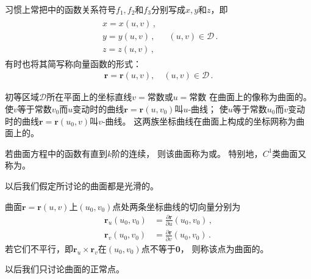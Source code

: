 习惯上常把中的函数关系符号$f_1,f_2$和$f_3$分别写成$x,y$和$z$，即
\begin{align}\label{eq:03ex01.10}
    \begin{array}{l}
        x=x(u,v)\, , \\
        y=y(u,v)\, , \\
        z=z(u,v)\, ,
    \end{array}\quad (u,v)\in \mathscr{D}\, .
\end{align}
有时也将其简写称向量函数的形式：
\begin{align}\label{eq:03ex01.11}
    \bm r=\bm r(u,v),\quad (u,v)\in \mathscr{D}\, .
\end{align}

\begin{definition}
    初等区域$\mathscr{D}$所在平面上的坐标直线$v=$常数或$u=$常数
    在曲面上的像称为曲面的。
    使$v$等于常数$v_0$而$u$变动时的曲线$\bm r=\bm r(u,v_0)$叫$u$-曲线；
    使$u$等于常数$u_0$而$v$变动时的曲线$\bm r=\bm r(u_0,v)$叫$v$-曲线。
    这两族坐标曲线在曲面上构成的坐标网称为曲面上的。
\end{definition}

\begin{definition}
    若曲面方程中的函数有直到$k$阶的连续，
    则该曲面称为或。
    特别地，$C^1$类曲面又称为。
\end{definition}

以后我们假定所讨论的曲面都是光滑的。

\begin{definition}
    曲面$\bm r=\bm r(u,v)$上$(u_0,v_0)$点处两条坐标曲线的切向量分别为
    \begin{align}\label{eq:03ex01.12}
        \bm r_u(u_0,v_0) & =\frac{\partial \bm r}{\partial u}(u_0,v_0)\, , \\
        \bm r_v(u_0,v_0) & =\frac{\partial \bm r}{\partial v}(u_0,v_0)\, .
    \end{align}
    若它们不平行，即$\bm r_u\times\bm r_v$在$(u_0,v_0)$点不等于$\bm 0$，
    则称该点为曲面的。
\end{definition}

以后我们只讨论曲面的正常点。

